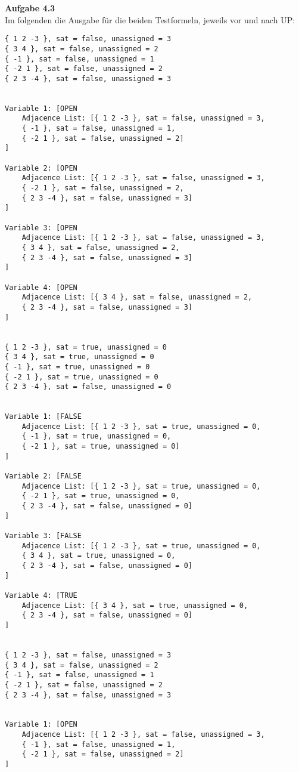 \documentclass[a4paper,10pt]{article}
\begin{document}
\noindent\textbf{Aufgabe 4.3}\\\smallskip
Im folgenden die Ausgabe für die beiden Testformeln, jeweils vor und nach UP:
\begin{verbatim}
{ 1 2 -3 }, sat = false, unassigned = 3
{ 3 4 }, sat = false, unassigned = 2
{ -1 }, sat = false, unassigned = 1
{ -2 1 }, sat = false, unassigned = 2
{ 2 3 -4 }, sat = false, unassigned = 3


Variable 1: [OPEN 
	Adjacence List: [{ 1 2 -3 }, sat = false, unassigned = 3, 
	{ -1 }, sat = false, unassigned = 1, 
	{ -2 1 }, sat = false, unassigned = 2]
]

Variable 2: [OPEN 
	Adjacence List: [{ 1 2 -3 }, sat = false, unassigned = 3, 
	{ -2 1 }, sat = false, unassigned = 2, 
	{ 2 3 -4 }, sat = false, unassigned = 3]
]

Variable 3: [OPEN 
	Adjacence List: [{ 1 2 -3 }, sat = false, unassigned = 3, 
	{ 3 4 }, sat = false, unassigned = 2, 
	{ 2 3 -4 }, sat = false, unassigned = 3]
]

Variable 4: [OPEN 
	Adjacence List: [{ 3 4 }, sat = false, unassigned = 2, 
	{ 2 3 -4 }, sat = false, unassigned = 3]
]


{ 1 2 -3 }, sat = true, unassigned = 0
{ 3 4 }, sat = true, unassigned = 0
{ -1 }, sat = true, unassigned = 0
{ -2 1 }, sat = true, unassigned = 0
{ 2 3 -4 }, sat = false, unassigned = 0


Variable 1: [FALSE 
	Adjacence List: [{ 1 2 -3 }, sat = true, unassigned = 0, 
	{ -1 }, sat = true, unassigned = 0, 
	{ -2 1 }, sat = true, unassigned = 0]
]

Variable 2: [FALSE 
	Adjacence List: [{ 1 2 -3 }, sat = true, unassigned = 0, 
	{ -2 1 }, sat = true, unassigned = 0, 
	{ 2 3 -4 }, sat = false, unassigned = 0]
]

Variable 3: [FALSE 
	Adjacence List: [{ 1 2 -3 }, sat = true, unassigned = 0, 
	{ 3 4 }, sat = true, unassigned = 0, 
	{ 2 3 -4 }, sat = false, unassigned = 0]
]

Variable 4: [TRUE 
	Adjacence List: [{ 3 4 }, sat = true, unassigned = 0, 
	{ 2 3 -4 }, sat = false, unassigned = 0]
]


{ 1 2 -3 }, sat = false, unassigned = 3
{ 3 4 }, sat = false, unassigned = 2
{ -1 }, sat = false, unassigned = 1
{ -2 1 }, sat = false, unassigned = 2
{ 2 3 -4 }, sat = false, unassigned = 3


Variable 1: [OPEN 
	Adjacence List: [{ 1 2 -3 }, sat = false, unassigned = 3, 
	{ -1 }, sat = false, unassigned = 1, 
	{ -2 1 }, sat = false, unassigned = 2]
]


\end{verbatim}
\end{document}
